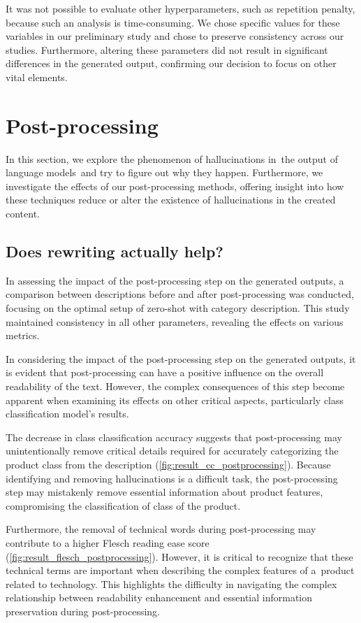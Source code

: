 It was not possible to evaluate other hyperparameters, such as repetition penalty, because such an analysis is time-consuming. We chose specific values for these variables in our preliminary study and chose to preserve consistency across our studies. Furthermore, altering these parameters did not result in significant differences in the generated output, confirming our decision to focus on other vital elements.

\section{Post-processing}

In this section, we explore the phenomenon of hallucinations in the output of language models and try to figure out why they happen. Furthermore, we investigate the effects of our post-processing methods, offering insight into how these techniques reduce or alter the existence of hallucinations in the created content.

\subsection{Does rewriting actually help?}

In assessing the impact of the post-processing step on the generated outputs, a comparison between descriptions before and after post-processing was conducted, focusing on the optimal setup of zero-shot with category description. This study maintained consistency in all other parameters, revealing the effects on various metrics.


In considering the impact of the post-processing step on the generated outputs, it is evident that post-processing can have a positive influence on the overall readability of the text. However, the complex consequences of this step become apparent when examining its effects on other critical aspects, particularly class classification model's results.

The decrease in class classification accuracy suggests that post-processing may unintentionally remove critical details required for accurately categorizing the product class from the description (\autoref{fig:result_cc_postprocessing}). Because identifying and removing hallucinations is a difficult task, the post-processing step may mistakenly remove essential information about product features, compromising the classification of class of the product.

Furthermore, the removal of technical words during post-processing may contribute to a higher Flesch reading ease score (\autoref{fig:result_flesch_postprocessing}). However, it is critical to recognize that these technical terms are important when describing the complex features of a product related to technology. This highlights the difficulty in navigating the complex relationship between readability enhancement and essential information preservation during post-processing.

